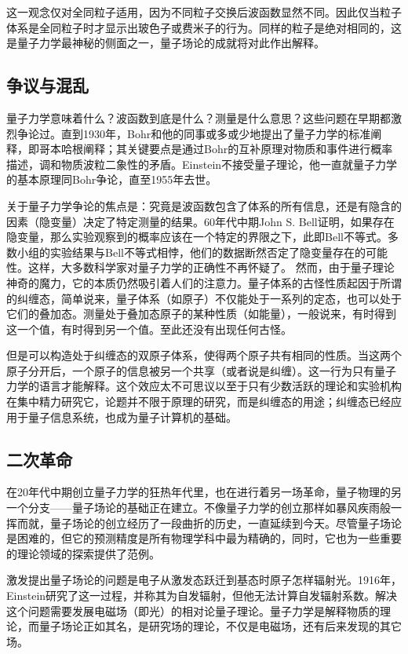 \documentclass[13pt,a4paper]{article}
\begin{document}
\begin{CJK}{UTF8}{song}
这一观念仅对全同粒子适用，因为不同粒子交换后波函数显然不同。因此仅当粒子体系是全同粒子时才显示出玻色子或费米子的行为。同样的粒子是绝对相同的，这是量子力学最神秘的侧面之一，量子场论的成就将对此作出解释。
 
\subsection{争议与混乱}
量子力学意味着什么？波函数到底是什么？测量是什么意思？这些问题在早期都激烈争论过。直到1930年，Bohr和他的同事或多或少地提出了量子力学的标准阐释，即哥本哈根阐释；其关键要点是通过Bohr的互补原理对物质和事件进行概率描述，调和物质波粒二象性的矛盾。Einstein不接受量子理论，他一直就量子力学的基本原理同Bohr争论，直至1955年去世。

关于量子力学争论的焦点是：究竟是波函数包含了体系的所有信息，还是有隐含的因素（隐变量）决定了特定测量的结果。60年代中期John S. Bell证明，如果存在隐变量，那么实验观察到的概率应该在一个特定的界限之下，此即Bell不等式。多数小组的实验结果与Bell不等式相悖，他们的数据断然否定了隐变量存在的可能性。这样，大多数科学家对量子力学的正确性不再怀疑了。
然而，由于量子理论神奇的魔力，它的本质仍然吸引着人们的注意力。量子体系的古怪性质起因于所谓的纠缠态，简单说来，量子体系（如原子）不仅能处于一系列的定态，也可以处于它们的叠加态。测量处于叠加态原子的某种性质（如能量），一般说来，有时得到这一个值，有时得到另一个值。至此还没有出现任何古怪。

但是可以构造处于纠缠态的双原子体系，使得两个原子共有相同的性质。当这两个原子分开后，一个原子的信息被另一个共享（或者说是纠缠）。这一行为只有量子力学的语言才能解释。这个效应太不可思议以至于只有少数活跃的理论和实验机构在集中精力研究它，论题并不限于原理的研究，而是纠缠态的用途；纠缠态已经应用于量子信息系统，也成为量子计算机的基础。
 
\subsection{二次革命}
在20年代中期创立量子力学的狂热年代里，也在进行着另一场革命，量子物理的另一个分支——量子场论的基础正在建立。不像量子力学的创立那样如暴风疾雨般一挥而就，量子场论的创立经历了一段曲折的历史，一直延续到今天。尽管量子场论是困难的，但它的预测精度是所有物理学科中最为精确的，同时，它也为一些重要的理论领域的探索提供了范例。

激发提出量子场论的问题是电子从激发态跃迁到基态时原子怎样辐射光。1916年，Einstein研究了这一过程，并称其为自发辐射，但他无法计算自发辐射系数。解决这个问题需要发展电磁场（即光）的相对论量子理论。量子力学是解释物质的理论，而量子场论正如其名，是研究场的理论，不仅是电磁场，还有后来发现的其它场。


\end{CJK}
\end{document}
